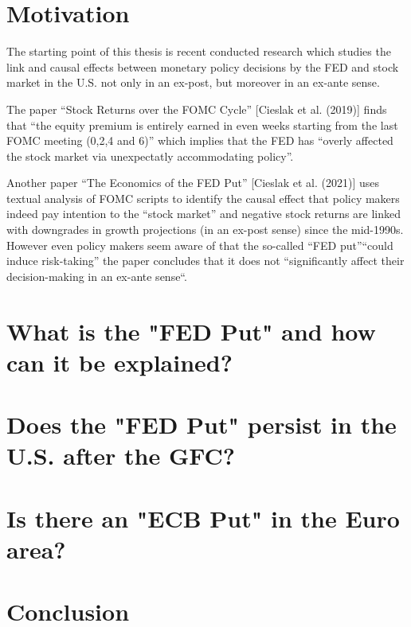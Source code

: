 
\chapter{Motivation}

The starting point of this thesis is recent conducted research which studies the link and causal effects between monetary policy decisions by the FED and stock market in the U.S. not only in an ex-post, but moreover in an ex-ante sense.

The paper “Stock Returns over the FOMC Cycle” [Cieslak et al. (2019)] finds that “the equity premium is entirely earned in even weeks starting from the last FOMC meeting (0,2,4 and 6)” which implies that the FED has “overly affected the stock market via unexpectatly accommodating policy”.

Another paper “The Economics of the FED Put”  [Cieslak et al. (2021)] uses textual analysis of FOMC scripts to identify the causal effect that policy makers indeed pay intention to the “stock market” and negative stock returns are linked with downgrades in growth projections (in an ex-post sense) since the mid-1990s.  However even policy makers seem aware of that the so-called “FED put”“could induce risk-taking” the paper concludes that it does not “significantly affect their decision-making in an ex-ante sense“.


\chapter{What is the "FED Put" and how can it be explained?}

\chapter{Does the "FED Put" persist in the U.S.  after the GFC?}

\chapter{Is there an "ECB Put" in the Euro area?}

\chapter{Conclusion}
